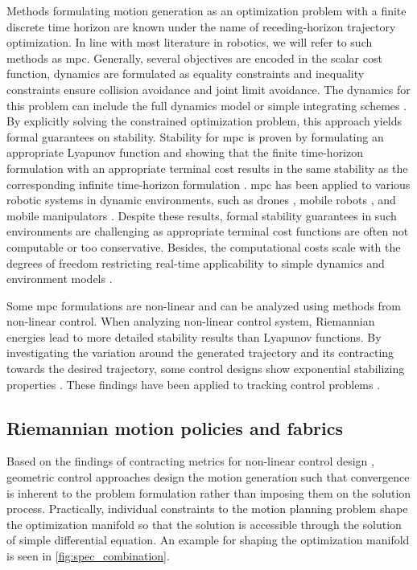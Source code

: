 Methods formulating motion generation as an optimization problem with a finite
discrete time horizon are known under the name of receding-horizon trajectory
optimization. In line with most literature in robotics, we will refer to such
methods as \ac{mpc}.
Generally, several objectives are encoded in the scalar cost function, dynamics
are formulated as equality constraints and inequality constraints ensure
collision avoidance and joint limit avoidance. The dynamics for this problem can
include the full dynamics model or simple integrating
schemes \cite{hewing2020learning}.
By explicitly solving the constrained optimization problem, this approach yields
formal guarantees on stability. Stability for \ac{mpc} is proven by formulating
an appropriate Lyapunov function and showing that the finite time-horizon
formulation with an appropriate terminal cost results in the same stability as
the corresponding infinite time-horizon formulation
\cite{l1,l4,keerthi1988optimal}. \ac{mpc} has been applied to various robotic
systems in dynamic environments, such as drones \cite{Tordesillas2019}, mobile
robots \cite{Brito2019}, and mobile manipulators
\cite{Avanzini2015,Avanzini2018}. Despite these results, formal stability
guarantees in such environments are challenging as appropriate terminal cost
functions are often not computable or too conservative. Besides, the
computational costs scale with the degrees of freedom restricting real-time
applicability to simple dynamics and environment models \cite{Spahn2021}.

Some \ac{mpc} formulations are non-linear and can be analyzed
using methods from non-linear control. When analyzing non-linear control
system, Riemannian energies lead to more detailed stability results than
Lyapunov functions. By investigating the variation around the generated
trajectory and its contracting towards the desired trajectory, some control
designs show exponential stabilizing properties \cite{l2}. These
findings have been applied to tracking control problems \cite{l3}.

\subsection{Riemannian motion policies and fabrics}%
\label{sub:riemannian_motion_policies_and_fabrics}

Based on the findings of contracting metrics for non-linear
control design \cite{l2,l3}, geometric control approaches design the motion
generation such that convergence is inherent to the problem formulation
rather than imposing them on the solution process. Practically, individual
constraints to the motion planning problem shape the optimization manifold
so that the solution is accessible through the solution of simple differential
equation. An example for shaping the optimization
manifold is seen in \cref{fig:spec_combination}.

